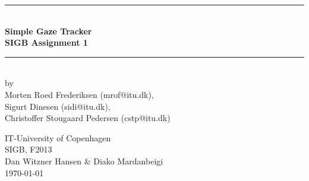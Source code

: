 \documentclass[]{article}
\begin{document}
\begin{titlepage}
\centering \parindent=0pt
\newcommand{\HRule}{\rule{\textwidth}{1mm}}
 \HRule\\[1cm]\Huge\bfseries
Simple Gaze Tracker\\[0.7cm]
\large SIGB Assignment 1\\[1cm]
\HRule\\[4cm]  
\large by 
\\Morten Roed Frederiksen (mrof@itu.dk),  
\\Sigurt Dinesen (sidi@itu.dk),
\\Christoffer Stougaard Pedersen (cstp@itu.dk)\\ 
 \normalsize %
\begin{flushleft}
IT-University of Copenhagen \\
SIGB, F2013\\
Dan Witzner Hansen \& Diako Mardanbeigi \\
\today \end{flushleft}
\end{titlepage}

\tableofcontents








\end{document}
